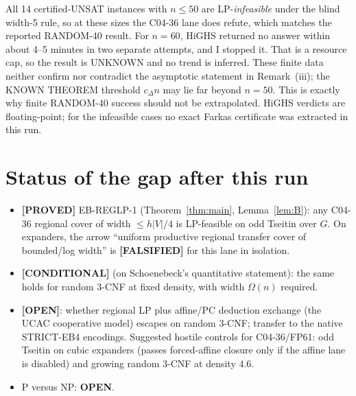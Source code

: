 \documentclass[11pt]{article}
\theoremstyle{remark}
\newcommand{\lab}[1]{\textbf{[#1]}}
\begin{document}
All 14 certified-UNSAT instances with $n\le50$ are LP-\emph{infeasible} under the blind width-5 rule, so at these sizes the C04-36 lane does refute, which matches the reported RANDOM-40 result. For $n=60$, HiGHS returned no answer within about 4--5 minutes in two separate attempts, and I stopped it. That is a resource cap, so the result is UNKNOWN and no trend is inferred. These finite data neither confirm nor contradict the asymptotic statement in Remark~(iii); the KNOWN THEOREM threshold $c_\Delta n$ may lie far beyond $n=50$. This is exactly why finite RANDOM-40 success should not be extrapolated. HiGHS verdicts are floating-point; for the infeasible cases no exact Farkas certificate was extracted in this run.

\section{Status of the gap after this run}
\begin{itemize}\setlength\itemsep{0pt}
\item \lab{PROVED} EB-REGLP-1 (Theorem~\ref{thm:main}, Lemma~\ref{lem:B}): any C04-36 regional
cover of width $\le h|V|/4$ is LP-feasible on odd Tseitin over $G$. On expanders, the arrow ``uniform
productive regional transfer cover of bounded/log width'' is \lab{FALSIFIED} for this lane in isolation.
\item \lab{CONDITIONAL} (on Schoenebeck's quantitative statement): the same holds for random 3-CNF at
fixed density, with width $\Omega(n)$ required.
\item \lab{OPEN}: whether regional LP plus affine/PC deduction exchange (the UCAC cooperative model)
escapes on random 3-CNF; transfer to the native STRICT-EB4 encodings. Suggested hostile controls for
C04-36/FP61: odd Tseitin on cubic expanders (passes forced-affine closure only if the affine lane is
disabled) and growing random 3-CNF at density 4.6.
\item P versus NP: \textbf{OPEN}.
\end{itemize}
\end{document}
